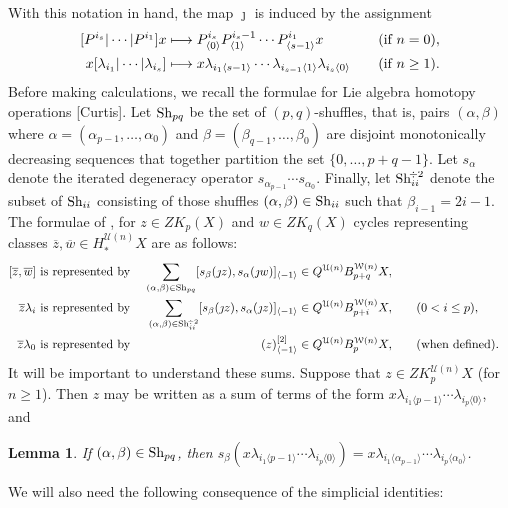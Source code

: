 \documentclass[11pt]{amsart}
\theoremstyle{plain}
\newtheorem{lem}[thm]{Lemma}
\theoremstyle{definition}
\newcommand{\calU}{\mathcal{U}}
\newcommand{\calw}{\mathcal{W}}
\theoremstyle{plain}
\newcommand{\restnwithsubscript}[2]{#1^{[2]}_{#2}}
\newcommand{\Shuffles}[2]{\textup{Sh}_{#1#2}}
\newcommand{\HalfShuffles}[2]{\textup{Sh}_{#1#2}^{\smash{\!\div2}}}
\begin{document}
\begin{Koszul complexes}
With this notation in hand, the map $\jmath$ is induced by the assignment
\begin{alignat*}{2}
[P^{i_s}|\cdots |P^{i_1}]x&\longmapsto P_{\langle 0\rangle}^{i_s}P_{\langle 1\rangle}^{i_s-1}\cdots P_{\langle s-1\rangle}^{i_1}x &\quad&(\textup{if }n=0),\\
x[\lambda_{i_1}|\cdots |\lambda_{i_s}]&\longmapsto x\lambda_{i_1\langle s-1\rangle}\cdots \lambda_{i_{s-1}\langle1\rangle}\lambda_{i_s\langle 0\rangle} &\quad&(\textup{if }n\geq1).%
\end{alignat*}
Before making calculations, we recall the formulae for Lie algebra homotopy operations [Curtis]. Let $\Shuffles{p}{q}$ be the set of $(p,q)$-shuffles, that is, pairs $(\alpha,\beta)$ where $\alpha=(\alpha_{p-1},\ldots,\alpha_0)$ and $\beta=(\beta_{q-1},\ldots,\beta_0)$ are disjoint monotonically decreasing sequences that together partition the set $\{0,\ldots,p+q-1\}$. Let $s_{\alpha}$ denote the iterated degeneracy operator $s_{\alpha_{p-1}}\cdots s_{\alpha_0}$.
Finally, let $\HalfShuffles{i}{i}$ denote the subset of $\Shuffles{i}{i}$ consisting of those shuffles $(\alpha,\beta)\in\Shuffles{i}{i}$ such that $\beta_{i-1}=2i-1$. The formulae of \cite[\S8]{CurtisSimplicialHtpy.pdf}, for $z\in ZK_p(X)$ and $w\in ZK_q(X)$ cycles representing classes $\overline{z},\overline{w}\in H_*^{\calU(n)}X$ are as follows:
\begin{alignat*}{3}
[\overline{z},\overline{w}]\textup{ is represented by }&&\sum_{(\alpha,\beta)\in\Shuffles{p}{q}}[s_\beta(\jmath z), s_\alpha(\jmath w)]_{\langle -1\rangle}&\in Q^{\calU(n)}B^{\calw(n)}_{p+q}X,\\
\overline{z}\lambda_i\textup{ is represented by }&&\sum_{(\alpha,\beta)\in\HalfShuffles{i}{i}}[s_\beta(\jmath z), s_\alpha(\jmath z)]_{\langle -1\rangle}&\in Q^{\calU(n)}B^{\calw(n)}_{p+i}X,&\quad&(0<i\leq p),\\
\overline{z}\lambda_0\textup{ is represented by }&&\restnwithsubscript{(z)}{\langle -1\rangle}&\in Q^{\calU(n)}B^{\calw(n)}_{p}X,&&(\textup{when defined}).
\end{alignat*}%
It will be important to understand these sums. Suppose that $z\in ZK_p^{\calU(n)}X$ (for $n\geq1$). Then  $z$ may be written as a sum of terms of the form $x\lambda_{i_1\langle p-1\rangle}\cdots \lambda_{i_p\langle 0\rangle}$, and
\begin{lem}\label{what degens do to iterated operations}
If $(\alpha,\beta)\in\Shuffles{p}{q}$, then $s_\beta(x\lambda_{i_1\langle p-1\rangle}\cdots \lambda_{i_p\langle 0\rangle})=x\lambda_{i_1\langle \alpha_{p-1}\rangle}\cdots \lambda_{i_p\langle \alpha_0\rangle}$.
\end{lem}
We will also need the following consequence of the simplicial identities:


\end{Koszul complexes}
\end{document}
